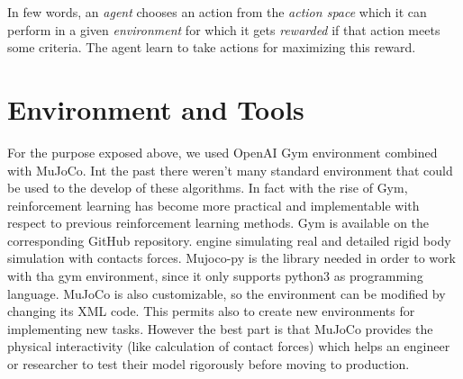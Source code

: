 \documentclass[a4paper]{report}
\begin{document}
In few words, an \textit{agent} chooses an action from the \textit{action space} which it can perform in a given \textit{environment} for which it gets \textit{rewarded} if that action meets some criteria. The agent learn to take actions for maximizing this reward.


\section{Environment and Tools}
 
For the purpose exposed above, we used OpenAI Gym environment combined with MuJoCo. Int the past there weren't many standard environment that could be used to the develop of these algorithms. In fact with the rise of Gym, reinforcement learning has become more practical and implementable with respect to previous  reinforcement learning methods. Gym is available on the corresponding GitHub repository. 
engine simulating real and detailed rigid body simulation with contacts forces. Mujoco-py is the library needed in order to work with tha gym environment, since it only supports python3 as programming language. MuJoCo is also customizable, so the environment can be modified by changing its XML code. This permits also to create new environments for implementing new tasks. However the best part is that MuJoCo provides the physical interactivity (like calculation of contact forces) which helps an engineer or researcher to test their model rigorously before moving to production. 
\end{document}
